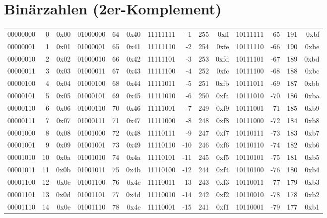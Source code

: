 \newpage
\section{Binärzahlen (2er-Komplement)}
	\begin{center}
	{ \small
	\begin{tabular}{| rrr | rrr | rrrr | rrrr |}
		
						\hline
			00000000 & 0 & 0x00 & 01000000 & 64 & 0x40 & 11111111 & -1 & 255 & 0xff & 10111111 & -65 & 191 & 0xbf \\
			00000001 & 1 & 0x01 & 01000001 & 65 & 0x41 & 11111110 & -2 & 254 & 0xfe & 10111110 & -66 & 190 & 0xbe \\
			00000010 & 2 & 0x02 & 01000010 & 66 & 0x42 & 11111101 & -3 & 253 & 0xfd & 10111101 & -67 & 189 & 0xbd \\
			00000011 & 3 & 0x03 & 01000011 & 67 & 0x43 & 11111100 & -4 & 252 & 0xfc & 10111100 & -68 & 188 & 0xbc \\
			00000100 & 4 & 0x04 & 01000100 & 68 & 0x44 & 11111011 & -5 & 251 & 0xfb & 10111011 & -69 & 187 & 0xbb \\
			00000101 & 5 & 0x05 & 01000101 & 69 & 0x45 & 11111010 & -6 & 250 & 0xfa & 10111010 & -70 & 186 & 0xba \\
			00000110 & 6 & 0x06 & 01000110 & 70 & 0x46 & 11111001 & -7 & 249 & 0xf9 & 10111001 & -71 & 185 & 0xb9 \\
			00000111 & 7 & 0x07 & 01000111 & 71 & 0x47 & 11111000 & -8 & 248 & 0xf8 & 10111000 & -72 & 184 & 0xb8 \\
			\hline
			00001000 & 8 & 0x08 & 01001000 & 72 & 0x48 & 11110111 & -9 & 247 & 0xf7 & 10110111 & -73 & 183 & 0xb7 \\
			00001001 & 9 & 0x09 & 01001001 & 73 & 0x49 & 11110110 & -10 & 246 & 0xf6 & 10110110 & -74 & 182 & 0xb6 \\
			00001010 & 10 & 0x0a & 01001010 & 74 & 0x4a & 11110101 & -11 & 245 & 0xf5 & 10110101 & -75 & 181 & 0xb5 \\
			00001011 & 11 & 0x0b & 01001011 & 75 & 0x4b & 11110100 & -12 & 244 & 0xf4 & 10110100 & -76 & 180 & 0xb4 \\
			00001100 & 12 & 0x0c & 01001100 & 76 & 0x4c & 11110011 & -13 & 243 & 0xf3 & 10110011 & -77 & 179 & 0xb3 \\
			00001101 & 13 & 0x0d & 01001101 & 77 & 0x4d & 11110010 & -14 & 242 & 0xf2 & 10110010 & -78 & 178 & 0xb2 \\
			00001110 & 14 & 0x0e & 01001110 & 78 & 0x4e & 11110001 & -15 & 241 & 0xf1 & 10110001 & -79 & 177 & 0xb1 \\

\end{tabular}}
\end{center}
